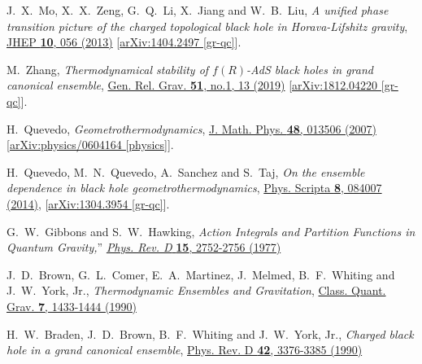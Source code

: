 \documentclass[pr, twocolumn, preprintnumbers, showpacs,footnoteadded, superscriptaddress,nofootinbib,longbibliography]{revtex4-1}
\begin{document}
\begin{thebibliography}{99}
J.~X.~Mo, X.~X.~Zeng, G.~Q.~Li, X.~Jiang and W.~B.~Liu,
\emph{A unified phase transition picture of the charged topological black hole in Horava-Lifshitz gravity},
\href{https://link.springer.com/article/10.10072FJHEP1028201329056}{JHEP \textbf{10}, 056 (2013)}
[\href{https://arxiv.org/pdf/1404.2497.pdf}{arXiv:1404.2497 [gr-qc]}].


M.~Zhang,
\emph{Thermodynamical stability of $f(R)$-AdS black holes in grand canonical ensemble},
\href{https://link.springer.com/article/10.1007/s10714-018-2491-0}{Gen. Rel. Grav. \textbf{51}, no.1, 13 (2019)}
[\href{https://arxiv.org/pdf/1812.04220.pdf}{arXiv:1812.04220 [gr-qc]}].

H.~Quevedo,
\emph{Geometrothermodynamics},
\href{https://aip.scitation.org/doi/10.1063/1.2409524}{J. Math. Phys. \textbf{48}, 013506 (2007)}
[\href{https://arxiv.org/pdf/physics/0604164.pdf}{arXiv:physics/0604164 [physics]}].


H.~Quevedo, M.~N.~Quevedo, A.~Sanchez and S.~Taj,
\emph{On the ensemble dependence in black hole geometrothermodynamics},
\href{https://iopscience.iop.org/article/10.1088/0031-8949/89/8/084007}{Phys. Scripta \textbf{8}, 084007 (2014)},
[\href{https://arxiv.org/pdf/1304.3954.pdf}{arXiv:1304.3954 [gr-qc]}].

G.~W.~Gibbons and S.~W.~Hawking,
\emph{{Action Integrals and Partition Functions in Quantum Gravity,}}''
\href{http://dx.doi.org/10.1103/PhysRevD.15.2752}{\emph{Phys. Rev. D} \textbf{15}, 2752-2756 (1977)}


J.~D.~Brown, G.~L.~Comer, E.~A.~Martinez, J.~Melmed, B.~F.~Whiting and J.~W.~York, Jr.,
\emph{Thermodynamic Ensembles and Gravitation},
\href{https://iopscience.iop.org/article/10.1088/0264-9381/7/8/020}{Class. Quant. Grav. \textbf{7}, 1433-1444 (1990)}

H.~W.~Braden, J.~D.~Brown, B.~F.~Whiting and J.~W.~York, Jr.,
\emph{Charged black hole in a grand canonical ensemble},
\href{https://journals.aps.org/prd/pdf/10.1103/PhysRevD.42.3376}{Phys. Rev. D \textbf{42}, 3376-3385 (1990)}




\end{thebibliography}
\end{document}
